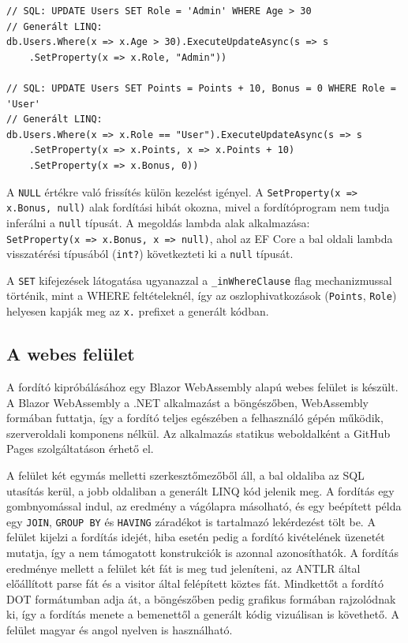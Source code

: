 \documentclass[a4paper,12pt]{article}
\begin{document}
\newpage

\begin{lstlisting}[caption={UPDATE fordítása konstans és kifejezés értékkel}, label={lst:update}]
// SQL: UPDATE Users SET Role = 'Admin' WHERE Age > 30
// Generált LINQ:
db.Users.Where(x => x.Age > 30).ExecuteUpdateAsync(s => s
    .SetProperty(x => x.Role, "Admin"))

// SQL: UPDATE Users SET Points = Points + 10, Bonus = 0 WHERE Role = 'User'
// Generált LINQ:
db.Users.Where(x => x.Role == "User").ExecuteUpdateAsync(s => s
    .SetProperty(x => x.Points, x => x.Points + 10)
    .SetProperty(x => x.Bonus, 0))
\end{lstlisting}

A \texttt{NULL} értékre való frissítés külön kezelést igényel. A \texttt{SetProperty(x => x.Bonus, null)} alak fordítási hibát okozna, mivel a fordítóprogram nem tudja inferálni a \texttt{null} típusát. A megoldás lambda alak alkalmazása: \\\texttt{SetProperty(x => x.Bonus, x => null)}, ahol az EF Core a bal oldali lambda visszatérési típusából (\texttt{int?}) következteti ki a \texttt{null} típusát.

A \texttt{SET} kifejezések látogatása ugyanazzal a \texttt{\_inWhereClause} flag mechanizmussal történik, mint a WHERE feltételeknél, így az oszlophivatkozások (\texttt{Points}, \texttt{Role}) helyesen kapják meg az \texttt{x.} prefixet a generált kódban.

\subsection{A webes felület}

A fordító kipróbálásához egy Blazor WebAssembly alapú webes felület is készült. A Blazor WebAssembly a .NET alkalmazást a böngészőben, WebAssembly formában futtatja, így a fordító teljes egészében a felhasználó gépén működik, szerveroldali komponens nélkül. Az alkalmazás statikus weboldalként a GitHub Pages szolgáltatáson érhető el.

A felület két egymás melletti szerkesztőmezőből áll, a bal oldaliba az SQL utasítás kerül, a jobb oldaliban a generált LINQ kód jelenik meg. A fordítás egy gombnyomással indul, az eredmény a vágólapra másolható, és egy beépített példa egy \texttt{JOIN}, \texttt{GROUP BY} és \texttt{HAVING} záradékot is tartalmazó lekérdezést tölt be. A felület kijelzi a fordítás idejét, hiba esetén pedig a fordító kivételének üzenetét mutatja, így a nem támogatott konstrukciók is azonnal azonosíthatók. A fordítás eredménye mellett a felület két fát is meg tud jeleníteni, az ANTLR által előállított parse fát és a visitor által felépített köztes fát. Mindkettőt a fordító DOT formátumban adja át, a böngészőben pedig grafikus formában rajzolódnak ki, így a fordítás menete a bemenettől a generált kódig vizuálisan is követhető. A felület magyar és angol nyelven is használható.
\end{document}
